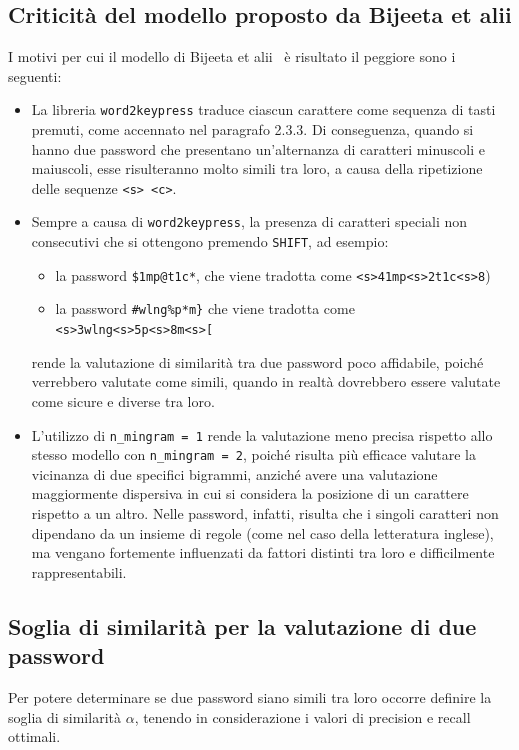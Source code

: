 \subsection{Criticità del modello proposto da Bijeeta et alii}
\label{sec:criticita bijeeta}
I motivi per cui il modello di Bijeeta et alii~\cite{biijeta} è risultato il peggiore sono i seguenti:
\begin{itemize}
    \item La libreria \texttt{word2keypress} traduce ciascun carattere come sequenza di tasti premuti, come accennato nel paragrafo 2.3.3. Di conseguenza, quando si hanno due password che presentano un'alternanza di caratteri minuscoli e maiuscoli, esse risulteranno molto simili tra loro, a causa della ripetizione delle sequenze \texttt{<s> <c>}.
    \item Sempre a causa di \texttt{word2keypress}, la presenza di caratteri speciali non consecutivi che si ottengono premendo \texttt{SHIFT}, ad esempio:
    \begin{itemize}
        \item la password \texttt{\$1mp@t1c*}, che viene tradotta come \texttt{<s>41mp<s>2t1c<s>8})
        \item la password \texttt{\#wlng\%p*m\}} che viene tradotta come\\ \texttt{<s>3wlng<s>5p<s>8m<s>[}
    \end{itemize}
    rende la valutazione di similarità tra due password poco affidabile, poiché verrebbero valutate come simili, quando in realtà dovrebbero essere valutate come sicure e diverse tra loro.
    \item L'utilizzo di \texttt{n\_mingram = 1} rende la valutazione meno precisa rispetto allo stesso modello con \texttt{n\_mingram = 2}, poiché risulta più efficace valutare la vicinanza di due specifici bigrammi, anziché avere una valutazione maggiormente dispersiva in cui si considera la posizione di un carattere rispetto a un altro. Nelle password, infatti, risulta che i singoli caratteri non dipendano da un insieme di regole (come nel caso della letteratura inglese), ma vengano fortemente influenzati da fattori distinti tra loro e difficilmente rappresentabili.
\end{itemize}

\subsection{Soglia di similarità per la valutazione di due password}
\label{sec:soglia similarita valutazione due password}
Per potere determinare se due password siano simili tra loro occorre definire la soglia di similarità $\alpha$, tenendo in considerazione i valori di precision e recall ottimali.

